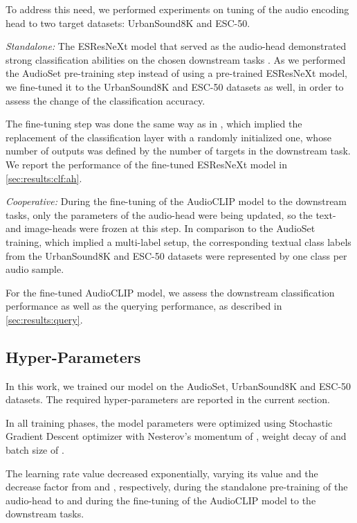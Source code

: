 \documentclass[runningheads]{llncs}
\begin{document}
To address this need, we performed experiments on tuning of the audio encoding head to two target datasets: \mbox{UrbanSound8K} and \mbox{ESC-50}.

\emph{Standalone:} The \mbox{ESResNeXt} model that served as the audio-head demonstrated strong classification abilities on the chosen downstream tasks \cite{guzhov2021esrnx}.
As we performed the \mbox{AudioSet} pre-training step instead of using a pre-trained \mbox{ESResNeXt} model, we fine-tuned it to the \mbox{UrbanSound8K} and \mbox{ESC-50} datasets as well, in order to assess the change of the classification accuracy.

The fine-tuning step was done the same way as in \cite{guzhov2021esrnx}, which implied the replacement of the classification layer with a randomly initialized one, whose number of outputs was defined by the number of targets in the downstream task.
We report the performance of the fine-tuned \mbox{ESResNeXt} model in \autoref{sec:results:clf:ah}.

\emph{Cooperative:} During the fine-tuning of the \mbox{AudioCLIP} model to the downstream tasks, only the parameters of the audio-head were being updated, so the text- and image-heads were frozen at this step.
In comparison to the \mbox{AudioSet} training, which implied a multi-label setup, the corresponding textual class labels from the \mbox{UrbanSound8K} and \mbox{ESC-50} datasets were represented by one class per audio sample.

For the fine-tuned \mbox{AudioCLIP} model, we assess the downstream classification performance as well as the querying performance, as described in \autoref{sec:results:query}.

\subsection{Hyper-Parameters} \label{sec:exp_setup:hparams}
In this work, we trained our model on the \mbox{AudioSet}, \mbox{UrbanSound8K} and \mbox{ESC-50} datasets.
The required hyper-parameters are reported in the current section.

In all training phases, the model parameters were optimized using Stochastic Gradient Descent \cite{polyak1992sgd} optimizer with Nesterov's momentum \cite{nesterov1983momentum} of , weight decay of  and batch size of .

The learning rate value decreased exponentially, varying its value  and the decrease factor  from  and , respectively, during the standalone pre-training of the audio-head to  and  during the fine-tuning of the \mbox{AudioCLIP} model to the downstream tasks.
\end{document}
